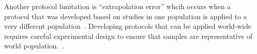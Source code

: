 {  Another protocol limitation is
  ``extrapolation error'' whcih  occurs when a protocol that was
  developed based on studies in one population is applied to a very
  different population~\cite{brosnan2015modest}. Developing protocols
  that can be applied world-wide requires careful experimental design
  to ensure that samples are representative of world
  population.~\cite{venhola2003interobserver}.
}

